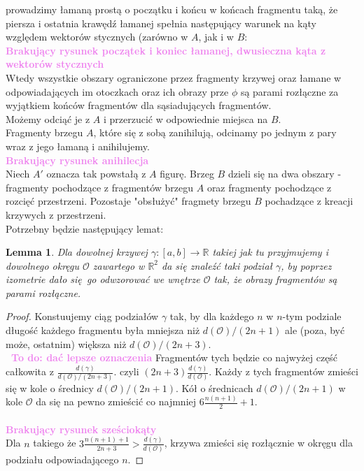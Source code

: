 \documentclass[a4paper, 12pt]{article}
\newtheorem{lemma}[observation]{Lemma}
\newcommand{\smalltodoII}[1]{\hfill \break \textbf{\ \textcolor{violet}{To do: #1}}\hfill \break}
\newcommand{\rysunek}[1]{\hfill \break\\[16pt] \Huge \textbf{\textcolor{violet}{Brakujący rysunek \normalsize
#1}} \hfill
\break \\[16pt] \normalsize}
\begin{document}
prowadzimy
łamaną prostą o początku i końcu w końcach fragmentu taką, że piersza i ostatnia krawędź łamanej
\label{180 stopni} spełnia
następujący warunek na kąty względem wektorów stycznych (zarówno w $A$, jak i w $B$:
\rysunek{początek i koniec łamanej, dwusieczna kąta  z wektorów stycznych}
Wtedy wszystkie obszary ograniczone przez fragmenty krzywej oraz łamane w odpowiadających im
otoczkach oraz ich obrazy prze $\phi$ są parami rozłączne za wyjątkiem końców fragmentów dla
sąsiadujących fragmentów. \\
Możemy odciąć je z $A$ i przerzucić w odpowiednie miejsca na $B$. \\
Fragmenty brzegu $A$, które się z sobą zanihilują, odcinamy po jednym z pary wraz z jego łamaną i
anihilujemy.
\rysunek{anihilecja}
Niech $A'$ oznacza tak powstałą z $A$ figurę.
Brzeg $B$ dzieli się na dwa obszary - fragmenty pochodzące z fragmentów brzegu $A$ oraz fragmenty
pochodzące z rozcięć przestrzeni.
Pozostaje "obsłużyć" fragmety brzegu $B$ pochadzące z kreacji krzywych z przestrzeni. \\
Potrzebny będzie następujący lemat:
\begin{lemma}\label{lemat o dzieleniu}
    Dla dowolnej krzywej $\gamma : [a, b] \to \mathbb{R}$ takiej jak tu przyjmujemy i dowolnego okręgu
    $\mathcal{O}$ zawartego w $\mathbb{R}^2$ da się znaleźć taki podział $\gamma$, by poprzez izometrie
    dało się go odwzorować we wnętrze $\mathcal{O}$ tak, że obrazy fragmentów są parami rozłączne.
\end{lemma}
\begin{proof}
    Konstuujemy ciąg podziałów $\gamma$
     tak, by dla każdego $n$ w $n$-tym podziale
     długość każdego fragmentu była mniejsza niż $d(\mathcal{O})/(2n+1)$ ale (poza, być może, ostatnim)
      większa niż $d(\mathcal{O})/(2n+3)$. \\
      \smalltodoII{dać lepsze oznaczenia}
     Fragmentów tych będzie co najwyżej część całkowita z $\frac{d(\gamma)}{d(\mathcal{O})/(2n+3)}$.
     czyli $(2n+3)\frac{d(\gamma)}{d(\mathcal{O})}$. Każdy z tych fragmentów zmieści się w kole
     o średnicy $d(\mathcal{O})/(2n+1)$. Kół o średnicach $d(\mathcal{O})/(2n+1)$ w kole $\mathcal{O}$ da się
      na pewno zmieścić co najmniej $6\frac{n(n+1)}{2}+1$. \\
      \rysunek{sześciokąty}
      Dla $n$ takiego że $3\frac{n(n+1)+1}{2n+3}>\frac{d(\gamma)}{d(\mathcal{O})}$, krzywa zmieści się
      rozłącznie w okręgu dla podziału odpowiadającego $n$.
\end{proof}
\end{document}
